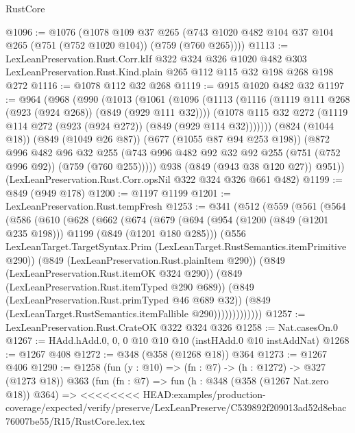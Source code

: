 \begin{lexlean}{RustCore}
\begin{coremodule}
{\begin{coremodule}
{{{{{@1096 := @1076
    (@1078
      @109
      @37
      @265
      (@743 @1020 @482 @104 @37 @104 @265 (@751 (@752 @1020 @104)) (@759 (@760 @265))))
@1113 := LexLeanPreservation.Rust.Corr.kIf
    @322
    @324
    @326
    @1020
    @482
    @303
    LexLeanPreservation.Rust.Kind.plain
    @265
    @112
    @115
    @32
    @198
    @268
    @198
    @272
@1116 := @1078 @112 @32 @268
@1119 := @915 @1020 @482 @32
@1197 := @964
    (@968
      (@990
        (@1013
          (@1061
            (@1096
              (@1113
                (@1116 (@1119 @111 @268 (@923 (@924 @268)) (@849 (@929 @111 @32))))
                (@1078 @115 @32 @272 (@1119 @114 @272 (@923 (@924 @272)) (@849 (@929 @114 @32)))))))
          (@824 (@1044 @18))
          (@849 (@1049 @26 @87))
          (@677 (@1055 @87 @94 @253 @198))
          (@872
            @996
            @482
            @96
            @32
            @255
            (@743 @996 @482 @92 @32 @92 @255 (@751 (@752 @996 @92)) (@759 (@760 @255)))))
        @938
        (@849 (@943 @38 @120 @27))
        @951))
    (LexLeanPreservation.Rust.Corr.opsNil @322 @324 @326 @661 @482)
@1199 := @849 (@949 @178)
@1200 := @1197 @1199
@1201 := LexLeanPreservation.Rust.tempFresh
@1253 := @341
    (@512
      (@559
        (@561
          (@564
            (@586
              (@610
                (@628
                  (@662
                    (@674
                      (@679
                        (@694
                          (@954 (@1200 (@849 (@1201 @235 @198))) @1199 (@849 (@1201 @180 @285)))
                          (@556
                            LexLeanTarget.TargetSyntax.Prim
                            (LexLeanTarget.RustSemantics.itemPrimitive @290))
                          (@849 (LexLeanPreservation.Rust.plainItem @290))
                          (@849 (LexLeanPreservation.Rust.itemOK @324 @290))
                          (@849 (LexLeanPreservation.Rust.itemTyped @290 @689))
                          (@849 (LexLeanPreservation.Rust.primTyped @46 @689 @32))
                          (@849 (LexLeanTarget.RustSemantics.itemFallible @290)))))))))))))
@1257 := LexLeanPreservation.Rust.CrateOK @322 @324 @326
@1258 := Nat.casesOn.{0}
@1267 := HAdd.hAdd.{0, 0, 0} @10 @10 @10 (instHAdd.{0} @10 instAddNat)
@1268 := @1267 @408
@1272 := @348 (@358 (@1268 @18)) @364
@1273 := @1267 @406
@1290 := @1258
    (fun (y : @10) => (fn : @7) -> (h : @1272) -> @327 (@1273 @18))
    @363
    (fun (fn : @7) =>
    fun (h : @348 (@358 (@1267 Nat.zero @18)) @364) =>
<<<<<<<< HEAD:examples/production-coverage/expected/verify/preserve/LexLeanPreserve/C539892f209013ad52d8ebac76007be55/R15/RustCore.lex.tex
}}}}}
\end{coremodule}}
\end{coremodule}
\end{lexlean}
